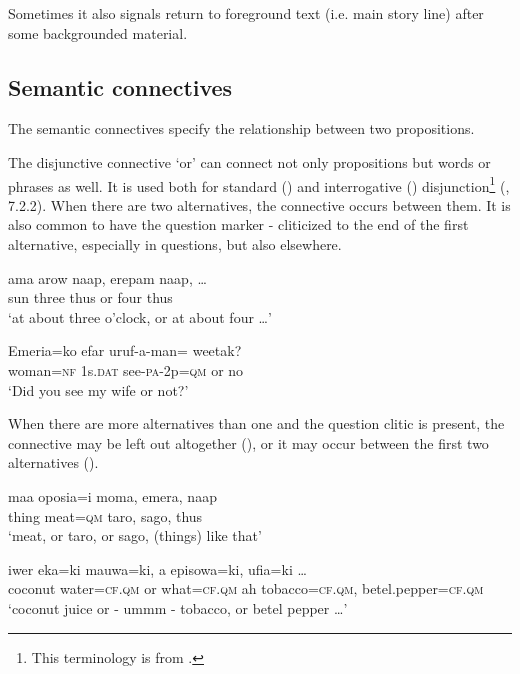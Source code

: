Sometimes it also signals return to foreground text (i.e. main story line) after some backgrounded material. 

\subsection{Semantic connectives}
{}
The semantic connectives specify the relationship between two propositions. 

The disjunctive connective  `or' can connect not only propositions but words or phrases as well. It is used both for standard () and interrogative () disjunction\footnote{This terminology is from \citet{Haspelmath2007}.} (, 7.2.2). When there are two alternatives, the connective occurs between them. It is also common to have the question marker - cliticized to the end of the first alternative, especially in questions, but also elsewhere.

\ea%
\label{ex:x724}
\gll ama arow naap,  erepam naap, {\dots} \\
sun three thus or four thus \\
\glt`at about three o'clock, or at about four {\dots}'
\z

\ea%
\label{ex:x725}
\gll Emeria=ko efar uruf-a-man=  weetak? \\
woman=\textsc{nf} 1s.\textsc{dat} see-\textsc{pa}-2p=\textsc{qm} or no\\
\glt`Did you see my wife or not?'
\z

When there are more alternatives than one and the question clitic is present, the connective may be left out altogether (), or it may occur between the first two alternatives (). 

\ea%
\label{ex:x726}
\gll maa oposia=i moma, emera, naap \\
thing meat=\textsc{qm} taro, sago, thus\\
\glt`meat, or taro, or sago, (things) like that'
\z

\ea%
\label{ex:x727}
\gll iwer eka=ki  mauwa=ki, a episowa=ki, ufia=ki {\dots}\\
coconut water=\textsc{cf}.\textsc{qm} or what=\textsc{cf}.\textsc{qm} ah tobacco=\textsc{cf}.\textsc{qm}, betel.pepper=\textsc{cf}.\textsc{qm}\\
\glt`coconut juice or - ummm - tobacco, or betel pepper {\dots}'
\z

